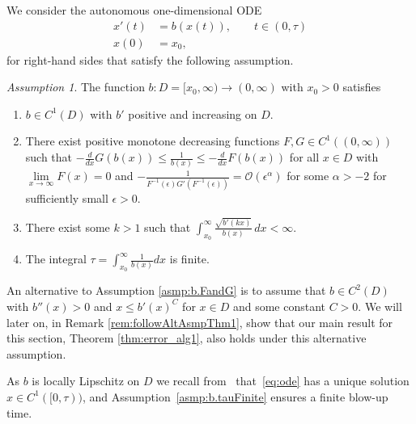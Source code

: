 \documentclass[a4paper, oneside, reqno]{amsart}
\theoremstyle{remark}
\newtheorem{assumption}{Assumption}
\renewcommand{\theassumption}{\Alph{assumption}}
\begin{document}
We consider the autonomous one-dimensional ODE
\begin{equation}
\label{eq:ode}
\begin{split}
    x'(t) &= b(x(t)), \qquad t \in (0, \tau)\\
    x(0) &= x_0,
\end{split}
\end{equation}
for right-hand sides that satisfy the following assumption. 
\begin{assumption}
The function \(b:D = [x_0, \infty) \to (0,\infty)\) with \(x_0>0\) satisfies
\begin{enumerate}[label=\arabic*), ref=\theassumption.\arabic*]
    \label{asmp:b}
    \item \(b \in C^1(D)\) with \(b'\) positive and increasing on \(D\). \label{asmp:b.C1_bDerPos}
    \item There exist positive monotone decreasing functions \(F, G\in C^1((0,\infty))\) such that \(-\frac{d}{dx}G(b(x)) \leq\frac{1}{b(x)} \leq -\frac{d}{dx}F(b(x))\) for all \(x\in D\) with 
    \mbox{\(\underset{x\to\infty}{\lim}F(x)=0\)} and \(-\frac{1}{F^{-1}(\epsilon)G'(F^{-1}(\epsilon))}=\mathcal{O}(\epsilon^{\alpha})\) for some \(\alpha>-2\) for sufficiently small \(\epsilon>0\). \label{asmp:b.FandG}
    \item There exist some \(k>1\) such that \(\int_{x_0}^\infty\frac{\sqrt{b'(kx)}}{b(x)} \, dx <\infty\). \label{asmp:b.integrabilityCond}
    \item The integral \(\tau = \int_{x_0}^\infty \frac{1}{b(x)}dx\) is finite. \label{asmp:b.tauFinite}
\end{enumerate}
\end{assumption}

\begin{remark}
    \label{rem:altAsmpThm1}
    An alternative to Assumption \ref{asmp:b.FandG} is to assume that \(b\in C^2(D)\) with \(b''(x) > 0\) and \(x \leq b'(x)^C\) for \(x \in D\) and some constant \(C > 0\). We will later on, in Remark \ref{rem:followAltAsmpThm1}, show that our main result for this section, Theorem \ref{thm:error_alg1}, also holds under this alternative assumption. 
\end{remark}

As $b$ is locally Lipschitz on $D$ we recall from~\cite[Chapter 2]{Walter1998} 
that~\eqref{eq:ode} has a unique solution \(x \in C^1([0,\tau))\), and 
Assumption~\ref{asmp:b.tauFinite} ensures a finite blow-up time. 
\end{document}
